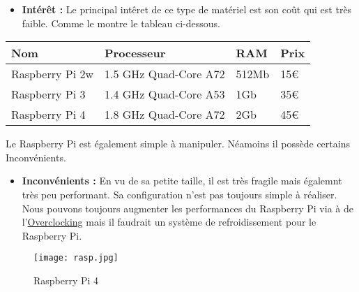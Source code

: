         \vspace{0.2cm}

        \begin{flushleft}
            \begin{itemize}
                \item \textbf{Intérêt :}
                Le principal intêret de ce type de matériel est son coût qui est très faible. Comme le montre le tableau ci-dessous.
            \end{itemize}                       

            \begin{center}
                \begin{tabular}{ |p{3cm}|p{3cm}|p{3cm}|p{3cm}|  }
                    \hline
                    Nom & Processeur & RAM & Prix\\
                    \hline
                    Raspberry Pi 2w & 1.5 GHz Quad-Core A72 & 512Mb & 15€\\
                    \hline
                    Raspberry Pi 3 & 1.4 GHz Quad-Core A53 & 1Gb & 35€\\
                    \hline
                    Raspberry Pi 4 & 1.8 GHz Quad-Core A72 & 2Gb & 45€\\
                    \hline
                \end{tabular}            
            \end{center}

            Le Raspberry Pi est également simple à manipuler. Néamoins il possède certains Inconvénients.

            \begin{center}
                \begin{itemize}
                    \item \textbf{Inconvénients :}
                    En vu de sa petite taille, il est très fragile mais égalemnt très peu performant.
                    Sa configuration n'est pas toujours simple à réaliser.
                    Nous pouvons toujours augmenter les performances du Raspberry Pi via à de l'\underline{Overclocking} mais il faudrait un système de refroidissement pour le Raspberry Pi.
                \end{itemize}
            \end{center}



        \end{flushleft}     
            
        \begin{figure}[ht]
            \centering
            \texttt{[image: rasp.jpg]}
            \caption{Raspberry Pi 4}
        \end{figure}
        
